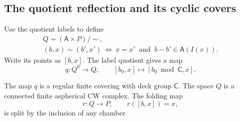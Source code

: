 \subsection{The quotient reflection and its cyclic covers}

Use the quotient labels to define
\begin{equation}\label{mod:reflection}
 \begin{gathered}
 Q=(\mathsf A\times P)/\sim,\\
 (b,x)\sim(b',x')
 \ \Longleftrightarrow\
 x=x'\ \text{ and }\ b-b'\in\mathsf A(I(x)).
 \end{gathered}
\end{equation}
Write its points as \([b,x]\).  The label quotient gives a map
\[
 q:Q^0\longrightarrow Q,\qquad [b_0,x]\longmapsto[b_0\bmod\mathsf C,x].
\]

\begin{lemma}\label{mod:quotient-cover}
The map \(q\) is a regular finite covering with deck group
\(\mathsf C\).  The space \(Q\) is a connected finite aspherical CW
complex.  The folding map
\begin{equation}\label{mod:folding}
 r:Q\longrightarrow P,\qquad r([b,x])=x,
\end{equation}
is split by the inclusion of any chamber.
\end{lemma}

